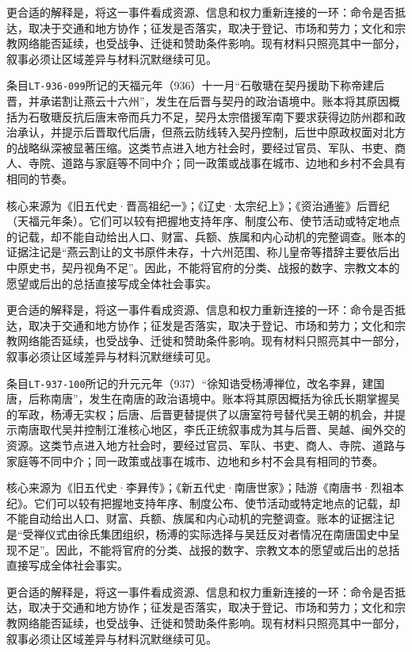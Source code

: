 更合适的解释是，将这一事件看成资源、信息和权力重新连接的一环：命令是否抵达，取决于交通和地方协作；征发是否落实，取决于登记、市场和劳力；文化和宗教网络能否延续，也受战争、迁徙和赞助条件影响。现有材料只照亮其中一部分，叙事必须让区域差异与材料沉默继续可见。

条目\texttt{LT-936-099}所记的天福元年（936）十一月“石敬瑭在契丹援助下称帝建后晋，并承诺割让燕云十六州”，发生在后晋与契丹的政治语境中。账本将其原因概括为石敬瑭反抗后唐末帝而兵力不足，契丹太宗借援军南下要求获得边防州郡和政治承认，并提示后晋取代后唐，但燕云防线转入契丹控制，后世中原政权面对北方的战略纵深被显著压缩。这类节点进入地方社会时，要经过官员、军队、书吏、商人、寺院、道路与家庭等不同中介；同一政策或战事在城市、边地和乡村不会具有相同的节奏。

核心来源为《旧五代史·晋高祖纪一》；《辽史·太宗纪上》；《资治通鉴》后晋纪（天福元年条）。它们可以较有把握地支持年序、制度公布、使节活动或特定地点的记载，却不能自动给出人口、财富、兵额、族属和内心动机的完整调查。账本的证据注记是“燕云割让的文书原件未存，十六州范围、称儿皇帝等措辞主要依后出中原史书，契丹视角不足”。因此，不能将官府的分类、战报的数字、宗教文本的愿望或后出的总括直接写成全体社会事实。

更合适的解释是，将这一事件看成资源、信息和权力重新连接的一环：命令是否抵达，取决于交通和地方协作；征发是否落实，取决于登记、市场和劳力；文化和宗教网络能否延续，也受战争、迁徙和赞助条件影响。现有材料只照亮其中一部分，叙事必须让区域差异与材料沉默继续可见。

条目\texttt{LT-937-100}所记的升元元年（937）“徐知诰受杨溥禅位，改名李昪，建国唐，后称南唐”，发生在南唐的政治语境中。账本将其原因概括为徐氏长期掌握吴的军政，杨溥无实权；后唐、后晋更替提供了以唐室符号替代吴王朝的机会，并提示南唐取代吴并控制江淮核心地区，李氏正统叙事成为其与后晋、吴越、闽外交的资源。这类节点进入地方社会时，要经过官员、军队、书吏、商人、寺院、道路与家庭等不同中介；同一政策或战事在城市、边地和乡村不会具有相同的节奏。

核心来源为《旧五代史·李昪传》；《新五代史·南唐世家》；陆游《南唐书·烈祖本纪》。它们可以较有把握地支持年序、制度公布、使节活动或特定地点的记载，却不能自动给出人口、财富、兵额、族属和内心动机的完整调查。账本的证据注记是“受禅仪式由徐氏集团组织，杨溥的实际选择与吴廷反对者情况在南唐国史中呈现不足”。因此，不能将官府的分类、战报的数字、宗教文本的愿望或后出的总括直接写成全体社会事实。

更合适的解释是，将这一事件看成资源、信息和权力重新连接的一环：命令是否抵达，取决于交通和地方协作；征发是否落实，取决于登记、市场和劳力；文化和宗教网络能否延续，也受战争、迁徙和赞助条件影响。现有材料只照亮其中一部分，叙事必须让区域差异与材料沉默继续可见。

